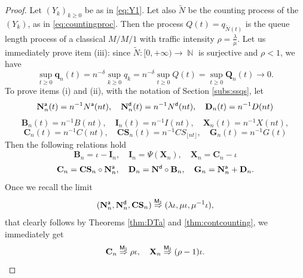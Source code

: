 \documentclass[10pt,a4paper]{amsart}
\DeclareMathOperator{\N}{\mathbb{N}}
\begin{document}
\begin{proof}
	Let $(Y_k)_{k \ge 0}$ be as in \eqref{eq:Y1}. Let also $\widetilde{N}$ be the counting process of the $(Y_k)$, as in \eqref{eq:countingproc}. Then the process $Q(t)=q_{\widetilde{N}(t)}$ is the queue length process of a classical $M/M/1$ with traffic intensity $\rho=\frac{\lambda}{\mu}$. Let us immediately prove item (iii): since $\widetilde{N}:[0,+\infty) \to \N$ is surjective and $\rho<1$, we have
	\begin{equation*}
		\sup_{t \ge 0}\mathbf{q}_n(t)=n^{-\delta}\sup_{k \ge 0}q_k=n^{-\delta}\sup_{t \ge 0}Q(t)=\sup_{t \ge 0}\mathbf{Q}_n(t) \to 0.
	\end{equation*}
	To prove items (i) and (ii), with the notation of Section \ref{subs:ssqs}, let
	\begin{equation*}
		\mathbf{N}_n^{\sf a}(t)=n^{-1}N^{\sf a}(nt), \quad \mathbf{N}_n^{\sf d}(t)=n^{-1}N^{\sf d}(nt), \quad \mathbf{D}_n(t)=n^{-1}D(nt)
	\end{equation*}
	\begin{equation*}
		\mathbf{B}_n(t)=n^{-1}B(nt), \quad \mathbf{I}_n(t)=n^{-1}I(nt), \quad \mathbf{X}_n(t)=n^{-1}X(nt),
	\end{equation*}
	\begin{equation*}
	\mathbf{C}_n(t)=n^{-1}C(nt), \quad \mathbf{CS}_n(t)=n^{-1}CS_{\lfloor nt \rfloor}, \quad  \mathbf{G}_n(t)=n^{-1}G(t)
	\end{equation*}
	Then the following relations hold
	\begin{equation*}
		\mathbf{B}_n=\iota-\mathbf{I}_n, \quad \mathbf{I}_n=\Psi(\mathbf{X}_n), \quad \mathbf{X}_n=\mathbf{C}_n-\iota
	\end{equation*}	
	\begin{equation*}
		\mathbf{C}_n=\mathbf{CS}_n \circ \mathbf{N}_n^{\sf a}, \quad \mathbf{D}_n=\mathbf{N}^{\sf d}\circ \mathbf{B}_n, \quad \mathbf{G}_n=\mathbf{N}^{\sf a}_n+\mathbf{D}_n.
	\end{equation*}
	Once we recall the limit
	\begin{equation*}
		(\mathbf{N}_n^{\sf a}, \mathbf{N}_n^{\sf d}, \mathbf{CS}_n) \overset{\sf M_1}{\Rightarrow} (\lambda \iota, \mu \iota, \mu^{-1}\iota),
	\end{equation*}
	that clearly follows by Theorems \ref{thm:DTa} and \ref{thm:contcounting}, we immediately get
	\begin{equation*}
		\mathbf{C}_n \overset{\sf M_1}{\Rightarrow} \rho \iota, \quad \mathbf{X}_n \overset{\sf M_1}{\Rightarrow} (\rho-1) \iota.
	\end{equation*}

\end{proof}
\end{document}
